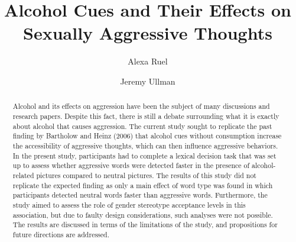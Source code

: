 \documentclass[authordate, serif, review]{jote-article}
\title{Alcohol Cues and Their Effects on Sexually Aggressive Thoughts}
\author[1]{Alexa Ruel}
\author[2]{Jeremy Ullman}
\affil[1]{Reviewer 1}
\affil[2]{Reviewer 2}
\begin{document}
\begin{frontmatter}
\maketitle

\begin{abstract}

\noindent Alcohol and its effects on aggression have been the subject of many discussions and research papers. Despite this fact, there is still a debate surrounding what it is exactly about alcohol that causes aggression. The current study sought to replicate the past finding by Bartholow and Heinz (2006) that alcohol cues without consumption increase the accessibility of aggressive thoughts, which can then influence aggressive behaviors. In the present study, participants had to complete a lexical decision task that was set up to assess whether aggressive words were detected faster in the presence of alcohol-related pictures compared to neutral pictures. The results of this study did not replicate the expected finding as only a main effect of word type was found in which participants detected neutral words faster than aggressive words. Furthermore, the study aimed to assess the role of gender stereotype acceptance levels in this association, but due to faulty design considerations, such analyses were not possible. The results are discussed in terms of the limitations of the study, and propositions for future directions are addressed. 

\end{abstract}
\end{frontmatter}
\end{document}
